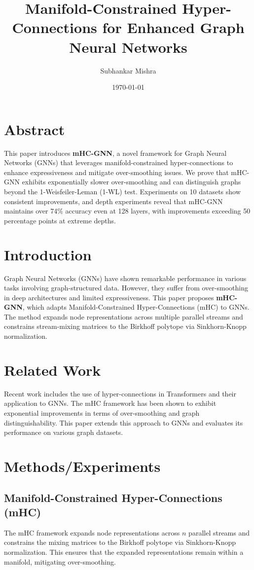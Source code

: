 \documentclass{article}
\title{Manifold-Constrained Hyper-Connections for Enhanced Graph Neural Networks}
\author{Subhankar Mishra}
\date{\today}
\begin{document}
\maketitle

\section{Abstract}
This paper introduces \textbf{mHC-GNN}, a novel framework for Graph Neural Networks (GNNs) that leverages manifold-constrained hyper-connections to enhance expressiveness and mitigate over-smoothing issues. We prove that mHC-GNN exhibits exponentially slower over-smoothing and can distinguish graphs beyond the 1-Weisfeiler-Leman (1-WL) test. Experiments on 10 datasets show consistent improvements, and depth experiments reveal that mHC-GNN maintains over 74\% accuracy even at 128 layers, with improvements exceeding 50 percentage points at extreme depths.

\section{Introduction}
\label{sec:introduction}
Graph Neural Networks (GNNs) have shown remarkable performance in various tasks involving graph-structured data. However, they suffer from over-smoothing in deep architectures and limited expressiveness. This paper proposes \textbf{mHC-GNN}, which adapts Manifold-Constrained Hyper-Connections (mHC) to GNNs. The method expands node representations across multiple parallel streams and constrains stream-mixing matrices to the Birkhoff polytope via Sinkhorn-Knopp normalization.

\section{Related Work}
\label{sec:related_work}
Recent work includes the use of hyper-connections in Transformers and their application to GNNs. The mHC framework has been shown to exhibit exponential improvements in terms of over-smoothing and graph distinguishability. This paper extends this approach to GNNs and evaluates its performance on various graph datasets.

\section{Methods/Experiments}
\label{sec:methods}
\subsection{Manifold-Constrained Hyper-Connections (mHC)}
\label{subsec:mhc}
The mHC framework expands node representations across $n$ parallel streams and constrains the mixing matrices to the Birkhoff polytope via Sinkhorn-Knopp normalization. This ensures that the expanded representations remain within a manifold, mitigating over-smoothing.
\end{document}
